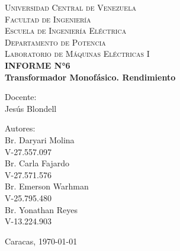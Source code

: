 \begin{titlepage}
    \begin{center}
        \textsc{ Universidad Central de Venezuela}\\
        \textsc{ Facultad de Ingeniería}\\
        \textsc{ Escuela de Ingeniería Eléctrica}\\
        \textsc{ Departamento de Potencia}\\
        \textsc{ Laboratorio de Máquinas Eléctricas I}\\[2cm]
        
        {\Large \bfseries INFORME N°6}\\[0.2cm]
        {\Large \bfseries Transformador Monofásico. Rendimiento}
        
        \vfill
        
        \begin{minipage}{0.4\textwidth}
            \begin{flushleft}
                {Docente:}\\
                Jesús Blondell
            \end{flushleft}
        \end{minipage}%
        \hfill
        \begin{minipage}{0.4\textwidth}
            \begin{flushright}
                {Autores:}\\
                Br. Daryari Molina\\
                V-27.557.097\\
                Br. Carla Fajardo\\
                V-27.571.576\\
                Br. Emerson Warhman\\
                V-25.795.480\\
                Br. Yonathan Reyes\\
                V-13.224.903
            \end{flushright}
        \end{minipage}
        
        \vfill
        
        { Caracas, \today} %
    \end{center}
\end{titlepage}
